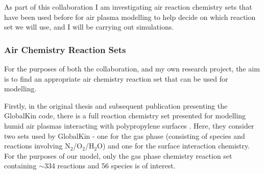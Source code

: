 \documentclass[11pt, oneside]{article}   	%
\begin{document}
As part of this collaboration I am investigating air reaction chemistry sets that have been used before for air plasma modelling to help decide on which reaction set we will use, and I will be carrying out simulations.




\subsubsection{Air Chemistry Reaction Sets}
For the purposes of both the collaboration, and my own research project, the aim is to find an appropriate air chemistry reaction set that can be used for modelling.

Firstly, in the original thesis and subsequent publication presenting the GlobalKin code, there is a full reaction chemistry set presented for modelling humid air plasmas interacting with polypropylene surfaces \cite{Dorai2002modeling, Dorai2003a}.
Here, they consider two sets used by GlobalKin - one for the gas phase (consisting of species and reactions involving N$_2$/O$_2$/H$_2$O) and one for the surface interaction chemistry.
For the purposes of our model, only the gas phase chemistry reaction set containing $\sim$334 reactions and 56 species is of interest.
\end{document}
